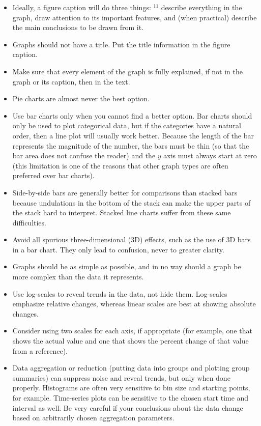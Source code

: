 \begin{itemize}
  \item Ideally, a figure caption will do three things: ${ }^{11}$ describe everything in the graph, draw attention to its important features, and (when practical) describe the main conclusions to be drawn from it.
  \item Graphs should not have a title. Put the title information in the figure caption.
  \item Make sure that every element of the graph is fully explained, if not in the graph or its caption, then in the text.
  \item Pie charts are almost never the best option.
  \item Use bar charts only when you cannot find a better option. Bar charts should only be used to plot categorical data, but if the categories have a natural order, then a line plot will usually work better. Because the length of the bar represents the magnitude of the number, the bars must be thin (so that the bar area does not confuse the reader) and the $y$ axis must always start at zero (this limitation is one of the reasons that other graph types are often preferred over bar charts).
  \item Side-by-side bars are generally better for comparisons than stacked bars because undulations in the bottom of the stack can make the upper parts of the stack hard to interpret. Stacked line charts suffer from these same difficulties.
  \item Avoid all spurious three-dimensional (3D) effects, such as the use of 3D bars in a bar chart. They only lead to confusion, never to greater clarity.
  \item Graphs should be as simple as possible, and in no way should a graph be more complex than the data it represents.
  \item Use log-scales to reveal trends in the data, not hide them. Log-scales emphasize relative changes, whereas linear scales are best at showing absolute changes.
  \item Consider using two scales for each axis, if appropriate (for example, one that shows the actual value and one that shows the percent change of that value from a reference).
  \item Data aggregation or reduction (putting data into groups and plotting group summaries) can suppress noise and reveal trends, but only when done properly. Histograms are often very sensitive to bin size and starting points, for example. Time-series plots can be sensitive to the chosen start time and interval as well. Be very careful if your conclusions about the data change based on arbitrarily chosen aggregation parameters.

\end{itemize}

